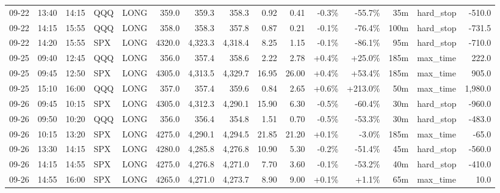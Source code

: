 \documentclass[11pt,a4paper,twoside]{article}
\begin{document}
\begin{landscape}
\begin{center}
\begin{longtable}{>{\color{txtmain}}l l l l l r r r r r r r r >{\color{txtmain}}l r}
09-22 & 13:40 & 14:15 & QQQ & LONG & 359.0 & 359.3 & 358.3 & 0.92 & 0.41 & \textcolor{lossred}{-0.3\%} & \textcolor{lossred}{-55.7\%} & 35m & hard\_stop & \textcolor{lossred}{-510.0} \\
09-22 & 14:15 & 15:55 & QQQ & LONG & 358.0 & 358.3 & 357.8 & 0.87 & 0.21 & \textcolor{lossred}{-0.1\%} & \textcolor{lossred}{-76.4\%} & 100m & hard\_stop & \textcolor{lossred}{-731.5} \\
09-22 & 14:20 & 15:55 & SPX & LONG & 4320.0 & 4,323.3 & 4,318.4 & 8.25 & 1.15 & \textcolor{lossred}{-0.1\%} & \textcolor{lossred}{-86.1\%} & 95m & hard\_stop & \textcolor{lossred}{-710.0} \\
09-25 & 09:40 & 12:45 & QQQ & LONG & 356.0 & 357.4 & 358.6 & 2.22 & 2.78 & \textcolor{wingreen}{+0.4\%} & \textcolor{wingreen}{+25.0\%} & 185m & max\_time & \textcolor{wingreen}{222.0} \\
09-25 & 09:45 & 12:50 & SPX & LONG & 4305.0 & 4,313.5 & 4,329.7 & 16.95 & 26.00 & \textcolor{wingreen}{+0.4\%} & \textcolor{wingreen}{+53.4\%} & 185m & max\_time & \textcolor{wingreen}{905.0} \\
09-25 & 15:10 & 16:00 & QQQ & LONG & 357.0 & 357.4 & 359.6 & 0.84 & 2.65 & \textcolor{wingreen}{+0.6\%} & \textcolor{wingreen}{+213.0\%} & 50m & max\_time & \textcolor{wingreen}{1,980.0} \\
09-26 & 09:45 & 10:15 & SPX & LONG & 4305.0 & 4,312.3 & 4,290.1 & 15.90 & 6.30 & \textcolor{lossred}{-0.5\%} & \textcolor{lossred}{-60.4\%} & 30m & hard\_stop & \textcolor{lossred}{-960.0} \\
09-26 & 09:50 & 10:20 & QQQ & LONG & 356.0 & 356.4 & 354.8 & 1.51 & 0.70 & \textcolor{lossred}{-0.5\%} & \textcolor{lossred}{-53.3\%} & 30m & hard\_stop & \textcolor{lossred}{-483.0} \\
09-26 & 10:15 & 13:20 & SPX & LONG & 4275.0 & 4,290.1 & 4,294.5 & 21.85 & 21.20 & \textcolor{wingreen}{+0.1\%} & \textcolor{lossred}{-3.0\%} & 185m & max\_time & \textcolor{lossred}{-65.0} \\
09-26 & 13:30 & 14:15 & SPX & LONG & 4280.0 & 4,285.8 & 4,276.8 & 10.90 & 5.30 & \textcolor{lossred}{-0.2\%} & \textcolor{lossred}{-51.4\%} & 45m & hard\_stop & \textcolor{lossred}{-560.0} \\
09-26 & 14:15 & 14:55 & SPX & LONG & 4275.0 & 4,276.8 & 4,271.0 & 7.70 & 3.60 & \textcolor{lossred}{-0.1\%} & \textcolor{lossred}{-53.2\%} & 40m & hard\_stop & \textcolor{lossred}{-410.0} \\
09-26 & 14:55 & 16:00 & SPX & LONG & 4265.0 & 4,271.0 & 4,273.7 & 8.90 & 9.00 & \textcolor{wingreen}{+0.1\%} & \textcolor{wingreen}{+1.1\%} & 65m & max\_time & \textcolor{wingreen}{10.0} \\

\end{longtable}
\end{center}
\end{landscape}
\end{document}
